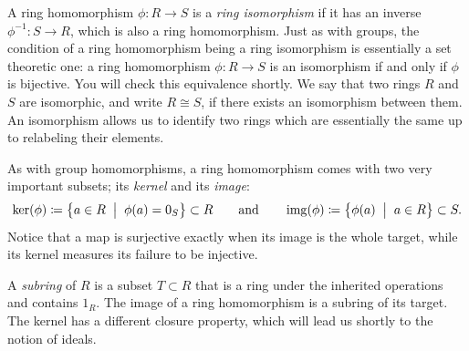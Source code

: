 \documentclass[Notebook.tex]{subfiles}
\begin{document}
A ring homomorphism $\phi:R \to S$ is a \emph{ring isomorphism} if it has an inverse $\phi^{-1}:S\to R$, which is also a ring homomorphism. Just as with groups, the condition of a ring homomorphism being a ring isomorphism is essentially a set theoretic one: a ring homomorphism $\phi:R \to S$ is an isomorphism if and only if $\phi$ is bijective. You will check this equivalence shortly. We say that two rings $R$ and $S$ are isomorphic, and write $R\cong S$, if there exists an isomorphism between them. An isomorphism allows us to identify two rings which are essentially the same up to relabeling their elements.

As with group homomorphisms, a ring homomorphism comes with two very important subsets; its \emph{kernel} and its \emph{image}:
\[
\ker(\phi) \coloneqq \left\{ a \in R \;\; \big| \;\; \phi(a) = 0_S \right\}\subset R \qquad \text{and} \qquad \operatorname{img}(\phi) \coloneqq \left\{\phi(a) \;\; \big| \;\; a \in R\right\} \subset S.
\]
Notice that a map is surjective exactly when its image is the whole target, while its kernel measures its failure to be injective.

A \emph{subring} of $R$ is a subset $T \subset R$ that is a ring under the inherited operations and contains $1_R$. The image of a ring homomorphism is a subring of its target. The kernel has a different closure property, which will lead us shortly to the notion of ideals.

\hrulefill
\end{document}
